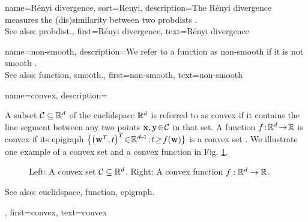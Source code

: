 {name={R\'enyi divergence}, 
	sort={Renyi},
	description={The R\'enyi divergence measures the (dis)similarity 
		between two \glspl{probdist} \cite{RenyiInfo95}.
				\\
		See also: \gls{probdist}.}, 
	first={R\'enyi divergence}, 
	text={R\'enyi divergence}
} 

{name={non-smooth},
	description={We refer to a \gls{function} as non-smooth if it is not 
		\gls{smooth} \cite{nesterov04}.
				\\
		See also: \gls{function}, \gls{smooth}.},
	first={non-smooth},
	text={non-smooth}
}

{name={convex},
	description={A subset $\mathcal{C} \subseteq \mathbb{R}^{d}$ of the 
		\gls{euclidspace} $\mathbb{R}^{d}$ is referred to as convex if it contains 
		the line segment between any two points ${\bf x}, {\bf y}\!\in\!\mathcal{C}$ in that set. A \gls{function}  
		$f\!:\!\mathbb{R}^{d}\!\rightarrow\!\mathbb{R}$ 
		is convex if its \gls{epigraph} $\big\{ \big( \weights^{T},t \big)^{T}\!\in\!\mathbb{R}^{\dimlocalmodel\!+\!1}\!:\!t\!\geq\!f(\weights) \}$ 
		is a convex set \cite{BoydConvexBook}. We illustrate one example of a convex set 
		and a convex \gls{function} in Fig. \ref{fig_convex_set_function}. 
		\begin{figure}[H]
		\begin{center}
			\vspace*{-8mm}
			\end{center}
			\caption{Left: A convex set $\mathcal{C} \subseteq \mathbb{R}^{d}$. 
				Right: A convex \gls{function} $f: \mathbb{R}^{d} \rightarrow \mathbb{R}$.\label{fig_convex_set_function}}
		\end{figure}
		See also: \gls{euclidspace}, \gls{function}, \gls{epigraph}.},
	first={convex},
	text={convex}
}


